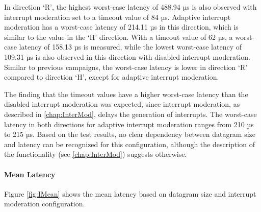 In direction `R', the highest worst-case latency of 488.94 µs is also observed with interrupt moderation set to a timeout value of 84 µs. Adaptive interrupt moderation has a worst-case latency of 214.11 µs in this direction, which is similar to the value in the `H' direction. With a timeout value of 62 µs, a worst-case latency of 158.13 µs is measured, while the lowest worst-case latency of 109.31 µs is also observed in this direction with disabled interrupt moderation. Similar to previous campaigns, the worst-case latency is lower in direction `R' compared to direction `H', except for adaptive interrupt moderation.

The finding that the timeout values have a higher worst-case latency than the disabled interrupt moderation was expected, since interrupt moderation, as described in \ref{chap:InterMod}, delays the generation of interrupts.  The worst-case latency in both directions for adaptive interrupt moderation ranges from 210 µs to 215 µs. Based on the test results, no clear dependency between datagram size and latency can be recognized for this configuration, although the description of the functionality (see \ref{chap:InterMod}) suggests otherwise.

\paragraph{Mean Latency}

Figure \ref{fig:IMean} shows the mean latency based on datagram size and interrupt moderation configuration.

